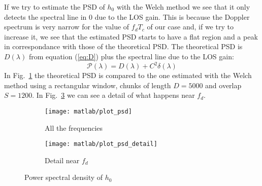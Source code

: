 \documentclass[a4paper,twoside]{article}
\begin{document}
If we try to estimate the PSD of $h_0$ with the Welch method we see
that it only detects the spectral line in 0 due to the LOS gain. This
is because the Doppler spectrum is very narrow for the value of
$f_dT_c$ of our case and, if we try to increase it, we see that the
estimated PSD starts to have a flat region and a peak in
correspondance with those of the theoretical PSD.  The theoretical PSD
is $D(\lambda)$ from equation (\ref{eq:D}) plus the spectral line due
to the LOS gain:
\begin{equation}
  \mathcal{P}(\lambda) = D(\lambda) + C^2\delta(\lambda)
\end{equation}
In Fig.~\ref{plot:psd} the theoretical PSD is compared to the one
estimated with the Welch method using a rectangular window, chunks of
length $D=5000$ and overlap $S=1200$. In Fig.~\ref{plot:psd_detail} we
can see a detail of what happens near $f_d$.
\begin{figure}[htbp]
  \centering
  \begin{subfigure}{0.7\textwidth}
    \centering
    \texttt{[image: matlab/plot\_psd]}
  \caption{All the frequencies}
  \label{plot:psd}
  \end{subfigure}
  \begin{subfigure}{0.7\textwidth}
    \centering
    \texttt{[image: matlab/plot\_psd\_detail]}
  \caption{Detail near $f_d$}
  \label{plot:psd_detail}
  \end{subfigure}
  \caption{Power spectral density of $h_0$}
\end{figure}
\end{document}
